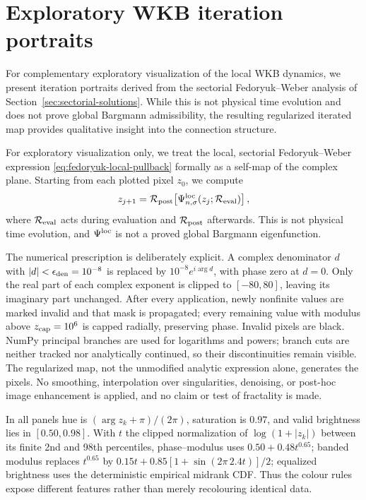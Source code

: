 \documentclass[11pt]{article}
\theoremstyle{remark}
\begin{document}
\appendix
\section{Exploratory WKB iteration portraits}
\label{app:wkb-portraits}

For complementary exploratory visualization of the local WKB dynamics,
we present iteration portraits derived from the sectorial Fedoryuk--Weber
analysis of Section~\ref{sec:sectorial-solutions}. While this is not physical
time evolution and does not prove global Bargmann admissibility, the
resulting regularized iterated map provides qualitative insight into the
connection structure.

For exploratory visualization only, we treat the local, sectorial
Fedoryuk--Weber expression \eqref{eq:fedoryuk-local-pullback} formally as a
self-map of the complex plane.  Starting from each plotted pixel $z_0$, we
compute
\begin{equation}
 z_{j+1}=\mathcal R_{\rm post}\!\left[
  \Psi_{n,\sigma}^{\rm loc}(z_j;\mathcal R_{\rm eval})\right],
 \label{eq:regularized-local-iteration}
\end{equation}
where \(\mathcal R_{\rm eval}\) acts during evaluation and
\(\mathcal R_{\rm post}\) afterwards.  This is not physical time evolution,
and \(\Psi^{\rm loc}\) is not a proved global Bargmann eigenfunction.

The numerical prescription is deliberately explicit.  A complex denominator
\(d\) with \(|d|<\epsilon_{\rm den}=10^{-8}\) is replaced by
\(10^{-8}e^{i\arg d}\), with phase zero at \(d=0\).  Only the real part of
each complex exponent is clipped to \([-80,80]\), leaving its imaginary part
unchanged.  After every application, newly nonfinite values are marked invalid
and that mask is propagated; every remaining value with modulus above
\(z_{\rm cap}=10^6\) is capped radially, preserving phase.  Invalid pixels
are black.  NumPy principal branches are used for logarithms and powers;
branch cuts are neither tracked nor analytically continued, so their
discontinuities remain visible.  The regularized map, not the unmodified
analytic expression alone, generates the pixels.  No smoothing, interpolation
over singularities, denoising, or post-hoc image enhancement is applied, and
no claim or test of fractality is made.

In all panels hue is \((\arg z_k+\pi)/(2\pi)\), saturation is \(0.97\), and
valid brightness lies in \([0.50,0.98]\).  With
\(t\) the clipped normalization of \(\log(1+|z_k|)\) between its finite
2nd and 98th percentiles, phase--modulus uses
\(0.50+0.48t^{0.65}\); banded modulus replaces \(t^{0.65}\) by
\(0.15t+0.85[1+\sin(2\pi\,2.4t)]/2\); equalized brightness uses the
deterministic empirical midrank CDF.  Thus the colour rules expose different
features rather than merely recolouring identical data.
\end{document}
